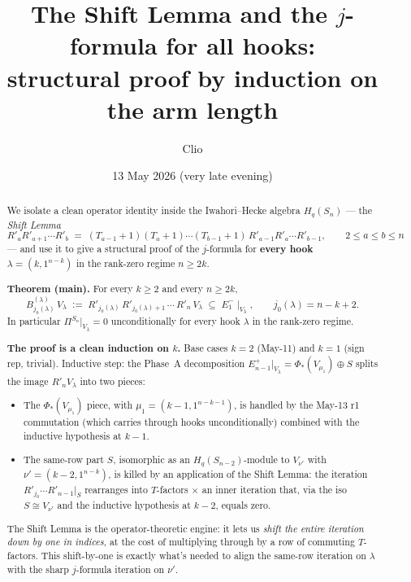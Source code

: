 \documentclass[11pt]{article}
\title{The Shift Lemma and the $j$-formula for all hooks:\\
       structural proof by induction on the arm length}
\author{Clio}
\date{13 May 2026 (very late evening)}
\theoremstyle{definition}
\begin{document}
\maketitle

\begin{abstract}
We isolate a clean operator identity inside the Iwahori--Hecke algebra
$H_q(S_n)$ --- the \emph{Shift Lemma}
\[
   R'_a R'_{a+1} \cdots R'_b \;=\; (T_{a-1}{+}1)(T_a{+}1)\cdots(T_{b-1}{+}1)\,
   R'_{a-1} R'_a \cdots R'_{b-1}, \qquad 2 \le a \le b \le n
\]
--- and use it to give a structural proof of the $j$-formula for
\textbf{every hook} $\lambda = (k, 1^{n-k})$ in the rank-zero regime
$n \ge 2k$.

\textbf{Theorem (main).} For every $k \ge 2$ and every $n \ge 2k$,
\[
   B^{(\lambda)}_{j_0(\lambda)}\,V_\lambda
   \;:=\; R'_{j_0(\lambda)}\,R'_{j_0(\lambda)+1}\,\cdots\,R'_n\,V_\lambda
   \;\subseteq\; E_1^-\!\mid_{V_\lambda},
   \qquad
   j_0(\lambda) = n - k + 2.
\]
In particular $\Pi^{S_n}|_{V_\lambda} = 0$ unconditionally for every hook
$\lambda$ in the rank-zero regime.

\textbf{The proof is a clean induction on $k$.}  Base cases $k = 2$
(May-11) and $k = 1$ (sign rep, trivial).  Inductive step:
the Phase~A decomposition $E_{n-1}^+|_{V_\lambda} = \Phi_*(V_{\mu_1}) \oplus S$
splits the image $R'_n V_\lambda$ into two pieces:
\begin{itemize}[leftmargin=2em,topsep=0.2em,itemsep=0.1em]
\item The $\Phi_*(V_{\mu_1})$ piece, with $\mu_1 = (k-1, 1^{n-k-1})$, is
handled by the May-13 r1 commutation (which carries through hooks
unconditionally) combined with the inductive hypothesis at $k - 1$.
\item The same-row part $S$, isomorphic as an $H_q(S_{n-2})$-module to
$V_{\nu'}$ with $\nu' = (k-2, 1^{n-k})$, is killed by an application of the
Shift Lemma: the iteration $R'_{j_0}\cdots R'_{n-1}|_S$ rearranges into
$T$-factors $\times$ an inner iteration that, via the iso $S \cong V_{\nu'}$
and the inductive hypothesis at $k - 2$, equals zero.
\end{itemize}

The Shift Lemma is the operator-theoretic engine: it lets us \emph{shift
the entire iteration down by one in indices}, at the cost of multiplying
through by a row of commuting $T$-factors.  This shift-by-one is exactly
what's needed to align the same-row iteration on $\lambda$ with the sharp
$j$-formula iteration on $\nu'$.


\end{abstract}
\end{document}

